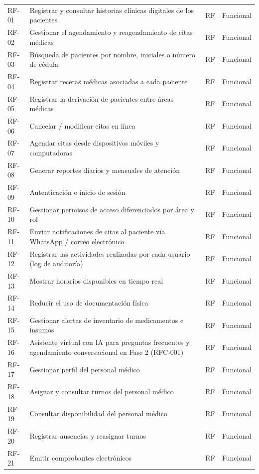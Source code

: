 \documentclass[11pt,a4paper]{article}
\begin{document}
\begin{longtable}{p{} p{} p{} p{}}
		\bottomrule
		\endlastfoot
		RF-01 & Registrar y consultar historias clínicas digitales de los pacientes & RF & Funcional \\
		RF-02 & Gestionar el agendamiento y reagendamiento de citas médicas & RF & Funcional \\
		RF-03 & Búsqueda de pacientes por nombre, iniciales o número de cédula & RF & Funcional \\
		RF-04 & Registrar recetas médicas asociadas a cada paciente & RF & Funcional \\
		RF-05 & Registrar la derivación de pacientes entre áreas médicas & RF & Funcional \\
		RF-06 & Cancelar / modificar citas en línea & RF & Funcional \\
		RF-07 & Agendar citas desde dispositivos móviles y computadoras & RF & Funcional \\
		RF-08 & Generar reportes diarios y mensuales de atención & RF & Funcional \\
		RF-09 & Autenticación e inicio de sesión & RF & Funcional \\
		RF-10 & Gestionar permisos de acceso diferenciados por área y rol & RF & Funcional \\
		RF-11 & Enviar notificaciones de citas al paciente vía WhatsApp / correo electrónico & RF & Funcional \\
		RF-12 & Registrar las actividades realizadas por cada usuario (log de auditoría) & RF & Funcional \\
		RF-13 & Mostrar horarios disponibles en tiempo real & RF & Funcional \\
		RF-14 & Reducir el uso de documentación física & RF & Funcional \\
		RF-15 & Gestionar alertas de inventario de medicamentos e insumos & RF & Funcional \\
		RF-16 & Asistente virtual con IA para preguntas frecuentes y agendamiento conversacional en Fase 2 (RFC-001) & RF & Funcional \\
		RF-17 & Gestionar perfil del personal médico & RF & Funcional \\
		RF-18 & Asignar y consultar turnos del personal médico & RF & Funcional \\
		RF-19 & Consultar disponibilidad del personal médico & RF & Funcional \\
		RF-20 & Registrar ausencias y reasignar turnos & RF & Funcional \\
		RF-21 & Emitir comprobantes electrónicos & RF & Funcional \\

\end{longtable}
\end{document}
